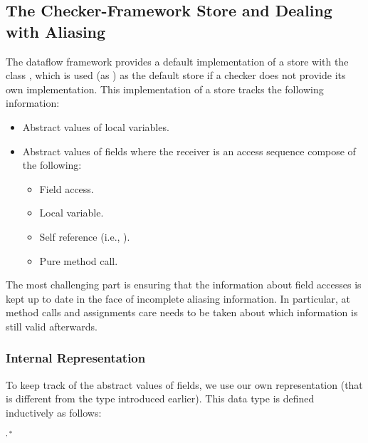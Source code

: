 \begin{new}

\subsection{The Checker-Framework Store and Dealing with Aliasing}

The dataflow framework provides a default implementation of a store with the
class , which is used (as ) as the
default store if a checker does not provide its own implementation.
This implementation of a store tracks the following information:
\begin{itemize}
	\item Abstract values of local variables.
	\item Abstract values of fields where the receiver is an access sequence
	compose of the following:
	\begin{itemize}
	\item Field access.
	\item Local variable.
	\item Self reference (i.e., ).
	\item Pure method call.
	\end{itemize}
\end{itemize}

The most challenging part is ensuring that the information about
field accesses is kept up to date in the face of incomplete aliasing
information.  In particular, at method calls and assignments care needs to be
taken about which information is still valid afterwards.

\subsubsection{Internal Representation}

To keep track of the abstract values of fields, we use our own representation
(that is different from the  type introduced earlier).  This
data type is defined inductively as follows:

\begin{bnfgrammar}
        { }
        {}
        {  
            \literal{(} $^{,*}$ \literal{)}}
\end{bnfgrammar}


\end{new}
